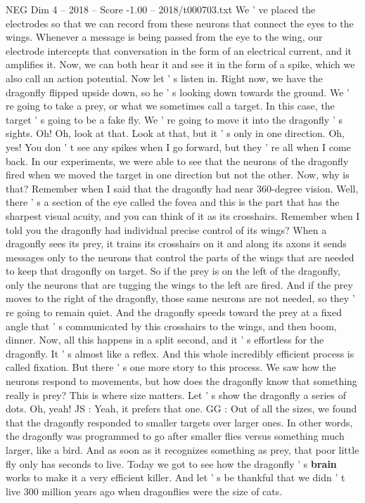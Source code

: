 \begin{textsample}{NEG Dim 4 – 2018 – Score -1.00 – 2018/t000703.txt}
We ' ve placed the electrodes so that we can record from these neurons that connect the eyes to the wings.
Whenever a message is being passed from the eye to the wing, our electrode intercepts that conversation in the form of an electrical current, and it amplifies it.
Now, we can both hear it and see it in the form of a spike, which we also call an action potential.
Now let ' s listen in.
Right now, we have the dragonfly flipped upside down, so he ' s looking down towards the ground.
We ' re going to take a prey, or what we sometimes call a target.
In this case, the target ' s going to be a fake fly.
We ' re going to move it into the dragonfly ' s sights.
Oh!
Oh, look at that.
Look at that, but it ' s only in one direction.
Oh, yes!
You don ' t see any spikes when I go forward, but they ' re all when I come back.
In our experiments, we were able to see that the neurons of the dragonfly fired when we moved the target in one direction but not the other.
Now, why is that?
Remember when I said that the dragonfly had near 360-degree vision.
Well, there ' s a section of the eye called the fovea and this is the part that has the sharpest visual acuity, and you can think of it as its crosshairs.
Remember when I told you the dragonfly had individual precise control of its wings?
When a dragonfly sees its prey, it trains its crosshairs on it and along its axons it sends messages only to the neurons that control the parts of the wings that are needed to keep that dragonfly on target.
So if the prey is on the left of the dragonfly, only the neurons that are tugging the wings to the left are fired.
And if the prey moves to the right of the dragonfly, those same neurons are not needed, so they ' re going to remain quiet.
And the dragonfly speeds toward the prey at a fixed angle that ' s communicated by this crosshairs to the wings, and then boom, dinner.
Now, all this happens in a split second, and it ' s effortless for the dragonfly.
It ' s almost like a reflex.
And this whole incredibly efficient process is called fixation.
But there ' s one more story to this process.
We saw how the neurons respond to movements, but how does the dragonfly know that something really is prey?
This is where size matters.
Let ' s show the dragonfly a series of dots.
Oh, yeah!
JS : Yeah, it prefers that one.
GG : Out of all the sizes, we found that the dragonfly responded to smaller targets over larger ones.
In other words, the dragonfly was programmed to go after smaller flies versus something much larger, like a bird.
And as soon as it recognizes something as prey, that poor little fly only has seconds to live.
Today we got to see how the dragonfly ' s \textbf{brain} works to make it a very efficient killer.
And let ' s be thankful that we didn ' t live 300 million years ago when dragonflies were the size of cats.

\end{textsample}
